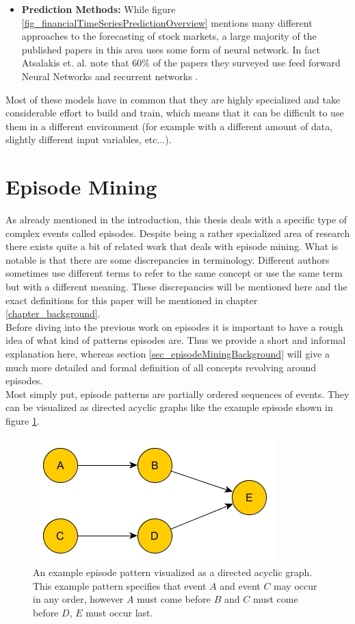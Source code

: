\begin{itemize}
	\item \textbf{Prediction Methods:} While figure \ref{fig_financialTimeSeriesPredictionOverview} mentions many different approaches to the forecasting of stock markets, a large majority of the published papers in this area uses some form of neural network. In fact Atsalakis et. al. note that 60\% of the papers they surveyed use feed forward Neural Networks and recurrent networks \cite{atsalakis2009surveying}. 
\end{itemize}

Most of these models have in common that they are highly specialized and take considerable effort to build and train, which means that it can be difficult to use them in a different environment (for example with a different amount of data, slightly different input variables, etc...).

\section{Episode Mining}
\label{sec_episodes}
As already mentioned in the introduction, this thesis deals with a specific type of complex events called episodes. Despite being a rather specialized area of research there exists quite a bit of related work that deals with episode mining. What is notable is that there are some discrepancies in terminology. Different authors sometimes use different terms to refer to the same concept or use the same term but with  a different meaning. These discrepancies will be mentioned here and the exact definitions for this paper will be mentioned in chapter \ref{chapter_background}. \\
Before diving into the previous work on episodes it is important to have a rough idea of what kind of patterns episodes are. Thus we provide a short and informal explanation here, whereas section \ref{sec_episodeMiningBackground} will give a much more detailed and formal definition of all concepts revolving around episodes. \\
Most simply put, episode patterns are partially ordered sequences of events. They can be visualized as directed acyclic graphs like the example episode shown in figure \ref{fig_exampleCompositeEpisode}. 

\begin{figure}[h]
	\centering
  	\includegraphics[width=.4\textwidth]{exampleCompositeEpisode}
	\caption{An example episode pattern visualized as a directed acyclic graph. This example pattern specifies that event $A$ and event $C$ may occur in any order, however $A$ must come before $B$ and $C$ must come before $D$, $E$ must occur last.}
	\label{fig_exampleCompositeEpisode}
\end{figure}

